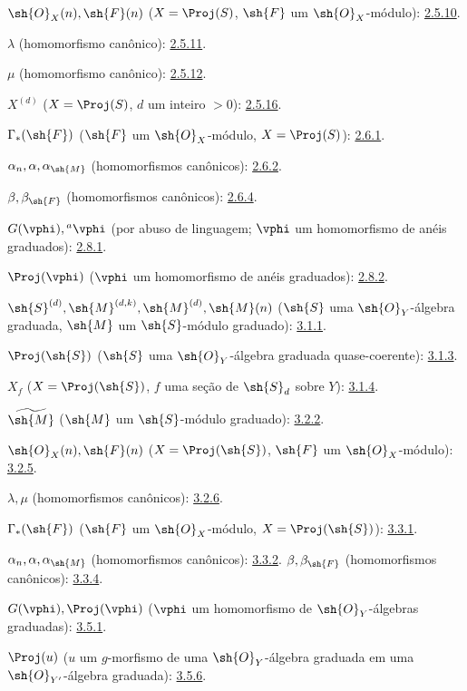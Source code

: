 \documentclass[oneside,10pt]{amsart}
\newcommand{\oldpage}[2][]{\marginnote{\normalfont\footnotesize\textbf{#1}~|~#2}\ignorespaces}
\begin{document}
$\sh{O}_X(n),\sh{F}(n)$
($X=\Proj(S)$, $\sh{F}$ um $\sh{O}_X$-módulo): \hyperref[II.2.5.10]{2.5.10}.

$\lambda$ (homomorfismo canônico): \hyperref[II.2.5.11]{2.5.11}.

$\mu$ (homomorfismo canônico): \hyperref[II.2.5.12]{2.5.12}.

$X^{(d)}$ ($X=\Proj(S)$, $d$ um inteiro $>0$): \hyperref[II.2.5.16]{2.5.16}.

$\Gamma_*(\sh{F})$ ($\sh{F}$ um $\sh{O}_X$-módulo,
$X=\Proj(S)$): \hyperref[II.2.6.1]{2.6.1}.

$\alpha_n,\alpha,\alpha_{\sh{M}}$ (homomorfismos canônicos): \hyperref[II.2.6.2]{2.6.2}.

$\beta,\beta_{\sh{F}}$ (homomorfismos canônicos): \hyperref[II.2.6.4]{2.6.4}.

$G(\vphi),{}^a\vphi$ (por abuso de linguagem;
$\vphi$ um homomorfismo de anéis graduados): \hyperref[II.2.8.1]{2.8.1}.

$\Proj(\vphi)$ ($\vphi$ um homomorfismo de anéis graduados): \hyperref[II.2.8.2]{2.8.2}.

$\sh{S}^{(d)},\sh{M}^{(d,k)},\sh{M}^{(d)},\sh{M}(n)$
($\sh{S}$ uma $\sh{O}_Y$-álgebra graduada,
$\sh{M}$ um $\sh{S}$-módulo graduado): \hyperref[II.3.1.1]{3.1.1}.

$\Proj(\sh{S})$ ($\sh{S}$ uma $\sh{O}_Y$-álgebra graduada quase-coerente): \hyperref[II.3.1.3]{3.1.3}.

$X_f$ ($X=\Proj(\sh{S})$, $f$ uma seção de $\sh{S}_d$ sobre $Y$): \hyperref[II.3.1.4]{3.1.4}.

$\widetilde{\sh{M}}$ ($\sh{M}$ um $\sh{S}$-módulo graduado): \hyperref[II.3.2.2]{3.2.2}.

$\sh{O}_X(n),\sh{F}(n)$
($X=\Proj(\sh{S})$, $\sh{F}$ um $\sh{O}_X$-módulo): \hyperref[II.3.2.5]{3.2.5}.

$\lambda,\mu$ (homomorfismos canônicos): \hyperref[II.3.2.6]{3.2.6}.

$\Gamma_*(\sh{F})$ ($\sh{F}$ um $\sh{O}_X$-módulo,
$X=\Proj(\sh{S})$): \hyperref[II.3.3.1]{3.3.1}.

$\alpha_n,\alpha,\alpha_{\sh{M}}$ (homomorfismos canônicos): \hyperref[II.3.3.2]{3.3.2}.
\oldpage[II]{208}
$\beta,\beta_{\sh{F}}$ (homomorfismos canônicos): \hyperref[II.3.3.4]{3.3.4}.

$G(\vphi),\Proj(\vphi)$
($\vphi$ um homomorfismo de $\sh{O}_Y$-álgebras graduadas): \hyperref[II.3.5.1]{3.5.1}.

$\Proj(u)$ ($u$ um $g$-morfismo de uma $\sh{O}_Y$-álgebra graduada
em uma $\sh{O}_{Y'}$-álgebra graduada): \hyperref[II.3.5.6]{3.5.6}.
\end{document}
